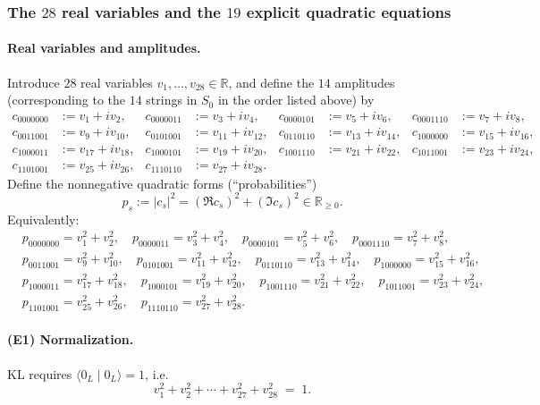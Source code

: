 \documentclass[11pt]{article}
\begin{document}
\subsubsection*{The $28$ real variables and the $19$ explicit quadratic equations}

\paragraph{Real variables and amplitudes.}
Introduce $28$ real variables $v_1,\dots,v_{28}\in\mathbb R$, and define the $14$ amplitudes
(corresponding to the $14$ strings in $S_0$ in the order listed above) by
\begin{align*}
c_{0000000}&:=v_1+i v_2,&
c_{0000011}&:=v_3+i v_4,&
c_{0000101}&:=v_5+i v_6,&
c_{0001110}&:=v_7+i v_8,\\
c_{0011001}&:=v_9+i v_{10},&
c_{0101001}&:=v_{11}+i v_{12},&
c_{0110110}&:=v_{13}+i v_{14},&
c_{1000000}&:=v_{15}+i v_{16},\\
c_{1000011}&:=v_{17}+i v_{18},&
c_{1000101}&:=v_{19}+i v_{20},&
c_{1001110}&:=v_{21}+i v_{22},&
c_{1011001}&:=v_{23}+i v_{24},\\
c_{1101001}&:=v_{25}+i v_{26},&
c_{1110110}&:=v_{27}+i v_{28}.&&
\end{align*}
Define the nonnegative quadratic forms (``probabilities'')
\[
p_s:=|c_s|^2=(\Re c_s)^2+(\Im c_s)^2\in\mathbb R_{\ge 0}.
\]
Equivalently:
\[
\begin{aligned}
&p_{0000000}=v_1^2+v_2^2,\quad p_{0000011}=v_3^2+v_4^2,\quad p_{0000101}=v_5^2+v_6^2,\quad p_{0001110}=v_7^2+v_8^2,\\
&p_{0011001}=v_9^2+v_{10}^2,\quad p_{0101001}=v_{11}^2+v_{12}^2,\quad p_{0110110}=v_{13}^2+v_{14}^2,\quad p_{1000000}=v_{15}^2+v_{16}^2,\\
&p_{1000011}=v_{17}^2+v_{18}^2,\quad p_{1000101}=v_{19}^2+v_{20}^2,\quad p_{1001110}=v_{21}^2+v_{22}^2,\quad p_{1011001}=v_{23}^2+v_{24}^2,\\
&p_{1101001}=v_{25}^2+v_{26}^2,\quad p_{1110110}=v_{27}^2+v_{28}^2.
\end{aligned}
\]

\paragraph{(E1) Normalization.}
KL requires $\langle 0_L\mid 0_L\rangle=1$, i.e.
\begin{equation}
\label{eq:poly-norm}
v_1^2+v_2^2+\cdots+v_{27}^2+v_{28}^2 \;=\; 1.
\tag{E1}
\end{equation}
\end{document}
